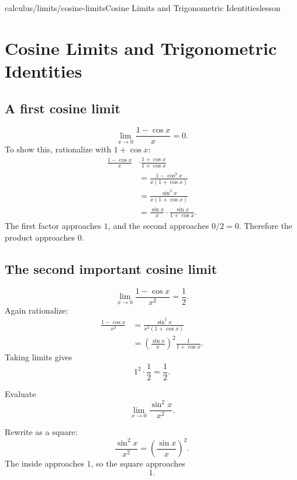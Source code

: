 \begin{webpage}{calculus/limits/cosine-limits}{Cosine Limits and Trigonometric Identities}{lesson}
\section{Cosine Limits and Trigonometric Identities}


\subsection{A first cosine limit}

\[
  \boxed{\lim_{x\to0}\frac{1-\cos x}{x}=0}.
\]
To show this, rationalize with \(1+\cos x\):
\begin{align*}
\frac{1-\cos x}{x}
&\cdot\frac{1+\cos x}{1+\cos x}\\
&=\frac{1-\cos^2x}{x(1+\cos x)}\\
&=\frac{\sin^2x}{x(1+\cos x)}\\
&=\frac{\sin x}{x}\cdot\frac{\sin x}{1+\cos x}.
\end{align*}
The first factor approaches \(1\), and the second approaches \(0/2=0\). Therefore the product approaches \(0\).

\subsection{The second important cosine limit}

\[
  \boxed{\lim_{x\to0}\frac{1-\cos x}{x^2}=\frac12}.
\]
Again rationalize:
\begin{align*}
\frac{1-\cos x}{x^2}
&=\frac{\sin^2x}{x^2(1+\cos x)}\\
&=\left(\frac{\sin x}{x}\right)^2\frac1{1+\cos x}.
\end{align*}
Taking limits gives
\[
  1^2\cdot\frac12=\frac12.
\]

\begin{bgguided}[title={Recognize the squared pattern}]
Evaluate
\[
  \lim_{x\to0}\frac{\sin^2x}{x^2}.
\]

\begin{bgsolution}
Rewrite as a square:
\[
  \frac{\sin^2x}{x^2}
  =\left(\frac{\sin x}{x}\right)^2.
\]
The inside approaches \(1\), so the square approaches
\[
  \boxed{1}.
\]
\end{bgsolution}
\end{bgguided}


\end{webpage}
